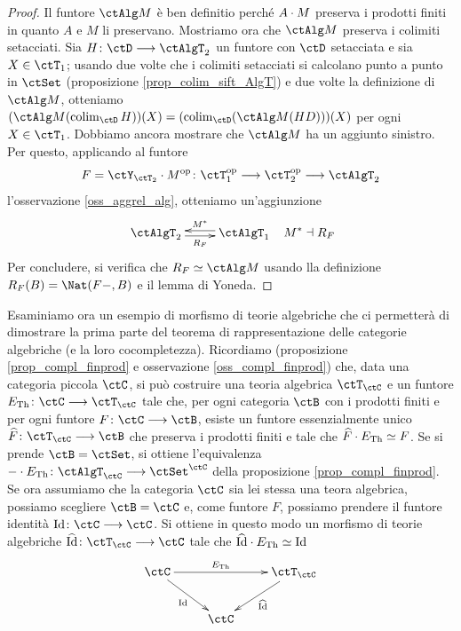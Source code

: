 \begin{proof}
 Il funtore \(\ctAlg M\) è ben definitio perché \(A \cdot M\) preserva i prodotti finiti in quanto \(A\) e \(M\) li preservano.
 Mostriamo ora che \(\ctAlg M\) preserva i colimiti setacciati. Sia \(H \colon \ctD \fun \ctAlgT_2\) un funtore con \(\ctD\)
 setacciata e sia \(X \in \ctT_1\); usando due volte che i colimiti setacciati si calcolano punto a punto in \(\ctSet\)
 (proposizione \ref{prop_colim_sift_AlgT}) e due volte la definizione di \(\ctAlg M\), otteniamo
 \((\ctAlg M(\colim_{\ctD}H))(X) = (\colim_{\ctD}(\ctAlg M(HD)))(X)\) per ogni \(X \in \ctT_1\).
 Dobbiamo ancora mostrare che \(\ctAlg M\) ha un aggiunto sinistro. Per questo, applicando al funtore
 \[ F = \ctY_{\ctT_2} \cmp M^{\op} \colon \ctT_1^{\op} \fun \ctT_2^{\op} \fun \ctAlgT_2 \]
 l'osservazione \ref{oss_aggrel_alg}, otteniamo un'aggiunzione
 \[ \xymatrix{\ctAlgT_2 \ar@<-0.5ex>[r]_-{R_F} & \ctAlgT_1 \ar@<-0.5ex>[l]_-{M^*} } \;\;\; M^* \dashv R_F \]
 Per concludere, si verifica che \(R_F \simeq \ctAlg M\) usando lla definizione \(R_F(B) = \Nat(F-,B)\) e il lemma di Yoneda.
\end{proof}

\begin{example}\label{ex_incl_ind}
 Esaminiamo ora un esempio di morfismo di teorie algebriche che ci permetterà di dimostrare la prima parte del teorema
 di rappresentazione delle categorie algebriche (e la loro cocompletezza).
 Ricordiamo (proposizione \ref{prop_compl_finprod} e osservazione \ref{oss_compl_finprod})
 che, data una categoria piccola \(\ctC\), si può costruire una teoria algebrica \(\ctT_{\ctC}\) e un  funtore
 \(E_{\mathrm{Th}} \colon \ctC \fun \ctT_{\ctC}\) tale che, per ogni categoria \(\ctB\) con i prodotti finiti e per ogni funtore \(F \colon \ctC \fun \ctB\),
 esiste un funtore essenzialmente unico \(\widehat{F} \colon \ctT_{\ctC} \fun \ctB\) che preserva i prodotti finiti e tale che
 \(\widehat{F} \cdot E_{\mathrm{Th}} \simeq F\). Se si prende \(\ctB = \ctSet\), si ottiene l'equivalenza
 \(- \cmp E_{\mathrm{Th}} \colon \ctAlgT_{\ctC} \fun \ctSet^{\ctC}\) della proposizione \ref{prop_compl_finprod}. Se ora assumiamo che la
 categoria \(\ctC\) sia lei stessa una teora algebrica, possiamo scegliere \(\ctB = \ctC\) e, come funtore \(F\), possiamo prendere il funtore
 identità \(\mathrm{Id} \colon \ctC \fun \ctC\). Si ottiene in questo modo un morfismo di teorie algebriche
 \(\widehat{\mathrm{Id}} \colon \ctT_{\ctC} \fun \ctC\) tale che \(\widehat{\mathrm{Id}} \cdot E_{\mathrm{Th}} \simeq \mathrm{Id}\)
 \[\xymatrix{\ctC \ar[rr]^-{E_{\mathrm{Th}}} \ar[rd]_{\mathrm{Id}} & & \ctT_{\ctC} \ar[ld]^{\widehat{\mathrm{Id}}} \\ & \ctC}\]
\end{example}

